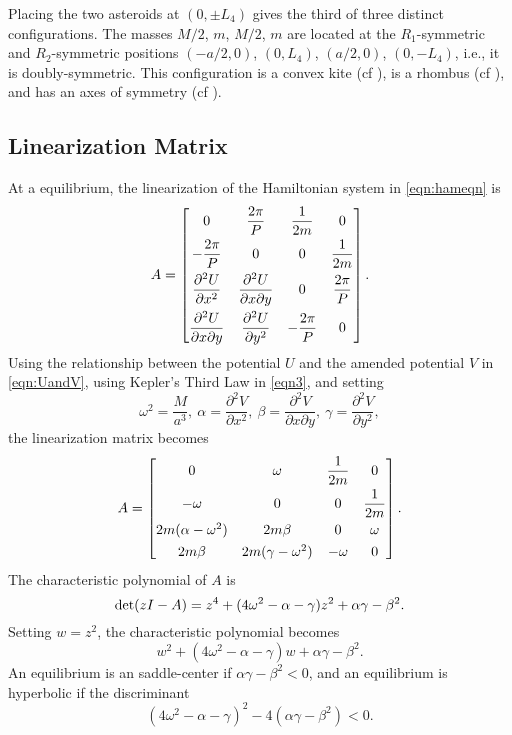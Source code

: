 \documentclass[12pt]{article}
\begin{document}
Placing the two asteroids at $(0,\pm L_4)$ gives the third of three distinct configurations. The masses $M/2$, $m$, $M/2$, $m$ are located at the $R_1$-symmetric and $R_2$-symmetric positions $(-a/2,0)$, $(0,L_4)$, $(a/2,0)$, $(0,-L_4)$, i.e., it is doubly-symmetric. This configuration is a convex kite (cf \cite{Corbera2014}), is a rhombus (cf \cite{Long2002}), and has an axes of symmetry (cf \cite{AlvarezRamirez2013}).




\subsection{Linearization Matrix}
At a equilibrium, the linearization of the Hamiltonian system in \eqref{eqn:hameqn} is
\[ A = \begin{bmatrix} 
0 & \displaystyle \frac{2\pi}{P} & \displaystyle \frac{1}{2m} & 0 \vspace{0.05in} \\
- \displaystyle \frac{2\pi}{P} & 0 & 0 & \displaystyle \frac{1}{2m} \vspace{0.05in} \\
\displaystyle \frac{\partial^2 U}{\partial x^2} & \displaystyle \frac{\partial^2U}{\partial x\partial y} & 0 & \displaystyle \frac{2\pi}{P} \vspace{0.05in} \\ 
\displaystyle \frac{\partial^2 U}{\partial x\partial y} & \displaystyle \frac{\partial^2U}{\partial y^2} & -\displaystyle \frac{2\pi}{P} & 0
\end{bmatrix}.
\]
Using the relationship between the potential $U$ and the amended potential $V$ in \eqref{eqn:UandV}, using Kepler's Third Law in \eqref{eqn3}, and setting
\[ \omega^2 = \frac{M}{a^3},\ \alpha = \frac{\partial^2 V}{\partial x^2}, \ \beta = \frac{\partial^2 V}{\partial x\partial y},\ \gamma = \frac{\partial^2 V}{\partial y^2},\]
the linearization matrix becomes
\[ 
A=\begin{bmatrix}
0 & \omega & \displaystyle \frac{1}{2m} & 0 \vspace{0.05in} \\
- \omega & 0 & 0 & \displaystyle \frac{1}{2m} \vspace{0.05in} \\
 2m (\alpha -\omega^2)   & \displaystyle 2m \beta  & 0 & \omega \vspace{0.05in} \\ 
2m \beta &  2m( \gamma -\omega^2)  & -\omega & 0
\end{bmatrix}.
\]
The characteristic polynomial of $A$ is
\[ {\rm det}(zI - A) = z^4 + (4\omega^2 - \alpha - \gamma)z^2 + \alpha\gamma - \beta^2.\]
Setting $w=z^2$, the characteristic polynomial becomes
\[ w^2 +(4\omega^2 - \alpha - \gamma) w + \alpha\gamma - \beta^2.\]
An equilibrium is an saddle-center if $\alpha\gamma-\beta^2<0$, and an equilibrium is hyperbolic if the discriminant
\[ (4\omega^2 - \alpha-\gamma)^2 - 4(\alpha\gamma - \beta^2) < 0.\]
\end{document}
